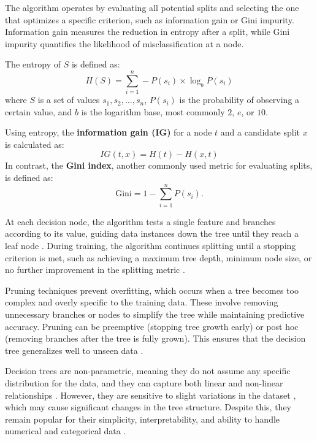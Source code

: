 The algorithm operates by evaluating all potential splits and selecting the one that optimizes a specific criterion, such as information gain or Gini impurity. 
Information gain measures the reduction in entropy after a split, while Gini impurity quantifies the likelihood of misclassification at a node. 

The entropy of \( S \) is defined as:
\begin{equation}
H(S) = \sum_{i=1}^{n} -P(s_i) \times \log_b P(s_i)
\end{equation}
where \( S \) is a set of values \( s_1, s_2, \dots, s_n \), \( P(s_i) \) is the probability of observing a certain value, and \( b \) is the logarithm base, most commonly \( 2 \), \( e \), or \( 10 \).

Using entropy, the \textbf{information gain (IG)} for a node \( t \) and a candidate split \( x \) is calculated as:
\begin{equation}
IG(t, x) = H(t) - H(x, t)
\end{equation}
In contrast, the \textbf{Gini index}, another commonly used metric for evaluating splits, is defined as:
\begin{equation}
\text{Gini} = 1 - \sum_{i=1}^{n} P(s_i).
\end{equation}

At each decision node, the algorithm tests a single feature and branches according to its value, guiding data instances down the tree until they reach a leaf node \parencite{Chauhan2022}. 
During training, the algorithm continues splitting until a stopping criterion is met, such as achieving a maximum tree depth, minimum node size, or no further improvement in the splitting metric \parencite{Chauhan2022}.

Pruning techniques prevent overfitting, which occurs when a tree becomes too complex and overly specific to the training data. 
These involve removing unnecessary branches or nodes to simplify the tree while maintaining predictive accuracy. 
Pruning can be preemptive (stopping tree growth early) or post hoc (removing branches after the tree is fully grown). 
This ensures that the decision tree generalizes well to unseen data \parencite{Huang2024}.

Decision trees are non-parametric, meaning they do not assume any specific distribution for the data, and they can capture both linear and non-linear relationships \parencite{Huang2024}. 
However, they are sensitive to slight variations in the dataset \parencite{Huang2024}, which may cause significant changes in the tree structure. 
Despite this, they remain popular for their simplicity, interpretability, and ability to handle numerical and categorical data \parencite{Chauhan2022}.

